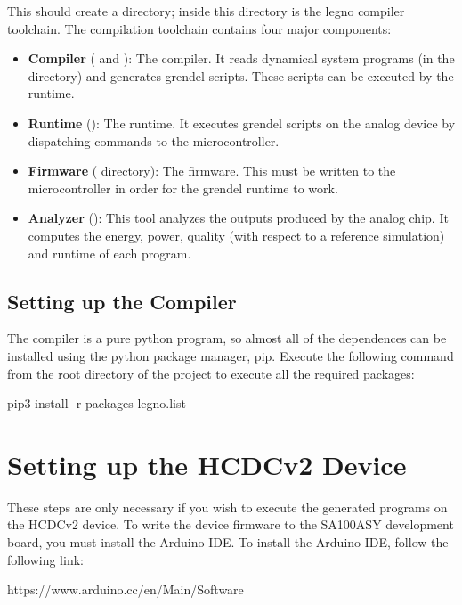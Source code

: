 This should create a  directory; inside this directory is the
legno compiler toolchain. The compilation toolchain contains four major components:

\begin{itemize}
\item\textbf{Compiler} ( and ): The compiler.
  It reads dynamical system programs (in the  directory) and generates
  grendel scripts. These scripts can be executed by the runtime.  
\item\textbf{Runtime} (): The runtime. It executes grendel
  scripts on the analog device by dispatching commands to the microcontroller.
\item\textbf{Firmware} ( directory): The firmware. This must be
  written to the microcontroller in order for the grendel runtime to work.
\item\textbf{Analyzer} (): This tool analyzes the outputs
  produced by the analog chip. It computes the energy, power, quality (with
  respect to a reference simulation) and runtime of each program.
\end{itemize}

\subsection{Setting up the Compiler}
The compiler is a pure python program, so almost all of the dependences can be
installed using the python package manager, pip. Execute the following command
from the root directory of the  project to execute all the required packages:

\begin{snippet}
  pip3 install -r packages-legno.list
\end{snippet}

\section{Setting up the HCDCv2 Device}
These steps are only necessary if you wish to execute the generated programs on
the HCDCv2 device. To write the device firmware to the SA100ASY development board, you must install the Arduino IDE. To install the Arduino IDE, follow the following link:

\begin{snippet}
https://www.arduino.cc/en/Main/Software
\end{snippet}

